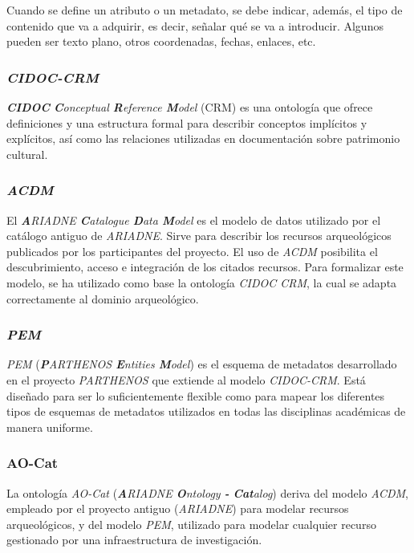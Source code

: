 Cuando se define un atributo o un metadato, se debe indicar, además, el
tipo de contenido que va a adquirir, es decir, señalar qué se va a
introducir. Algunos pueden ser texto plano, otros coordenadas, fechas,
enlaces, etc.

\subsubsection{\emph{CIDOC-CRM}}

\emph{\textbf{CIDOC} \textbf{C}onceptual \textbf{R}eference \textbf{M}odel}
\cite{cidoc:web} (CRM) es una
ontología que ofrece definiciones y una estructura formal para describir
conceptos implícitos y explícitos, así como las relaciones utilizadas en
documentación sobre patrimonio cultural. 

\subsubsection{\emph{ACDM}}

El \emph{\textbf{A}RIADNE \textbf{C}atalogue \textbf{D}ata \textbf{M}odel} es
el modelo de datos utilizado por el catálogo antiguo de \emph{ARIADNE}. Sirve
para describir los recursos arqueológicos publicados por los
participantes del proyecto. El uso de \emph{ACDM} posibilita el descubrimiento,
acceso e integración de los citados recursos. Para formalizar este
modelo, se ha utilizado como base la ontología \emph{CIDOC CRM}, la cual se
adapta correctamente al dominio arqueológico.

\subsubsection{\emph{PEM}}

\emph{PEM} \cite{art:pem}(\emph{\textbf{P}ARTHENOS \textbf{E}ntities \textbf{M}odel}) es el esquema
de metadatos desarrollado en el proyecto \emph{PARTHENOS} \cite{parthenos:web} que extiende al
modelo \emph{CIDOC-CRM}. Está diseñado para ser lo suficientemente flexible
como para mapear los diferentes tipos de esquemas de metadatos
utilizados en todas las disciplinas académicas de manera uniforme.

\subsubsection{AO-Cat}

La ontología \emph{AO-Cat} \cite{art:aocat} (\emph{\textbf{A}RIADNE \textbf{O}ntology
\textbf{-} \textbf{Cat}alog}) deriva del modelo \emph{ACDM}, empleado
por el proyecto antiguo (\emph{ARIADNE}) para modelar recursos arqueológicos, y
del modelo \emph{PEM}, utilizado para modelar cualquier recurso gestionado por
una infraestructura de investigación.

